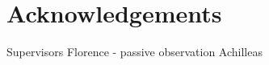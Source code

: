\chapter{Acknowledgements} \label{acknowledgements}

Supervisors
Florence - passive observation
Achilleas